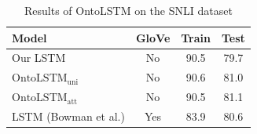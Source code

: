 \begin{table}
    \centering
    \begin{tabular}{|l|c|c|c|}
    \hline
    \textbf{Model} & \textbf{GloVe} & \textbf{Train} & \textbf{Test}\\
    \hline
    Our LSTM                        & No & 90.5 & 79.7 \\
    $\text{OntoLSTM}_{\text{uni}}$  & No & 90.6 & 81.0 \\
    $\text{OntoLSTM}_{\text{att}}$  & No & 90.5 & 81.1 \\ \hline
    LSTM (Bowman et al.) & Yes & 83.9 & 80.6 \\
    \hline
    \end{tabular}
    \caption{Results of OntoLSTM on the SNLI dataset}
    \label{tab:ontolstm_snli_results}
\end{table}






